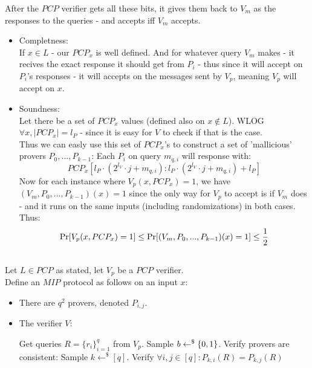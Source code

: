 After the $PCP$ verifier gets all these bits,
it gives them back to $V_m$ as the responses to the queries -
and accepts iff $V_m$ accepts.\\

\begin{itemize}
	\item Completness:\\
	If $x\in L$ - our $PCP_x$ is well defined.
	And for whatever query $V_m$ makes - it recives the exact
	response it should get from $P_i$ - thus since it will accept
	on $P_i$'s responses - it will accepts on the messages sent by $V_p$,
	meaning $V_p$ will accept on $x$.
	\item Soundness:\\
	Let there be a set of $PCP_x$ values (defined also on $x\notin L$).
	WLOG $\forall x,|PCP_x|=l_P$ - since it is easy for $V$ to check if that is the case.\\
	Thus we can easly use this set of $PCP_x$'s to
	construct a set of 'mallicious' provers $P_0,...,P_{k-1}$:
	Each $P_i$ on query $m_{q,i}$ will response with:
	\[
		PCP_x[l_P\cdot(2^{l_V}\cdot j+m_{q,i}):l_P\cdot(2^{l_V}\cdot j+m_{q,i})+l_P]
	\]
	Now for each instance where $V_p(x,PCP_x)=1$, we have
	$(V_m,P_0,...,P_{k-1})(x)=1$ since the only way for $V_p$
	to accept is if $V_m$ does - and it runs on the same inputs (including randomizations) in both cases.\\
	Thus:
	\[
		\operatorname*{Pr}[V_p(x,PCP_x)=1]\leq \operatorname*{Pr}[(V_m,P_0,...,P_{k-1})(x)=1]\leq\frac{1}{2}
	\] 
\end{itemize}

\subsection{}
Let $L\in PCP$ as stated, let $V_p$ be a $PCP$ verifier.\\
Define an $MIP$ protocol as follows on an input $x$:
\begin{itemize}
	\item There are $q^2$ provers, denoted $P_{i,j}$.
	\item The verifier $V$:\\
	\begin{algorithmic}
		\State Get queries $R=\{r_i\}_{i=1}^q$ from $V_p$.
		\State Sample $b\leftarrow^\$\{0,1\}$.
			\State Verify provers are consistent:
			\State Sample $k\leftarrow^\$[q]$.
			\State Verify $\forall i,j\in[q]:P_{k,i}(R)=P_{k,j}(R)$
		\Else
			\State 
		\EndIf 
	\end{algorithmic}
\end{itemize}

